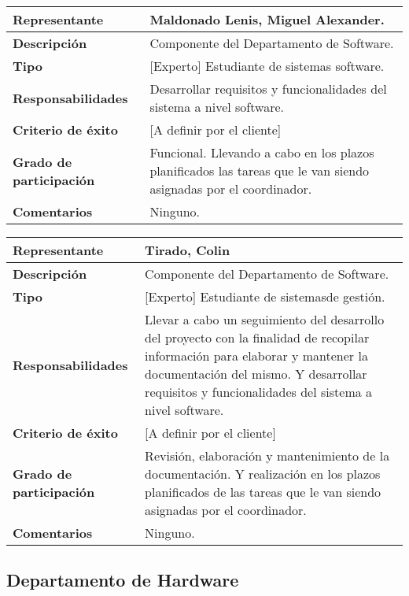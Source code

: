         \begin{tabular}{|p{4cm}|p{12cm}|}
            \hline \textbf{Representante} &  Maldonado Lenis, Miguel Alexander. \\
            \hline \textbf{Descripción} &  Componente del Departamento de Software.\\
            \hline \textbf{Tipo} &  [Experto] Estudiante de sistemas software.\\
            \hline \textbf{Responsabilidades} &  Desarrollar requisitos y funcionalidades del sistema a nivel software.\\
            \hline \textbf{Criterio de éxito} & [A definir por el cliente]\\
            \hline \textbf{Grado de participación} & Funcional. Llevando a cabo en los plazos planificados las tareas que le van siendo asignadas por el coordinador.\\
            \hline \textbf{Comentarios} &  Ninguno.\\
            \hline
        \end{tabular}
        
		\begin{tabular}{|p{4cm}|p{12cm}|}
            \hline \textbf{Representante} & Tirado, Colin \\
            \hline \textbf{Descripción} & Componente del Departamento de Software. \\
            \hline \textbf{Tipo} & [Experto] Estudiante de sistemasde gestión. \\
            \hline \textbf{Responsabilidades} & Llevar a cabo un seguimiento del desarrollo del proyecto con la finalidad de recopilar información para elaborar y mantener la documentación del mismo. Y desarrollar requisitos y funcionalidades del sistema a nivel software. \\
            \hline \textbf{Criterio de éxito} & [A definir por el cliente] \\
            \hline \textbf{Grado de participación} & Revisión, elaboración y mantenimiento de la documentación. Y realización en los plazos planificados de las tareas que le van siendo asignadas por el coordinador.  \\
            \hline \textbf{Comentarios} &  Ninguno. \\
            \hline
        \end{tabular}

    \subsection{Departamento de Hardware}

